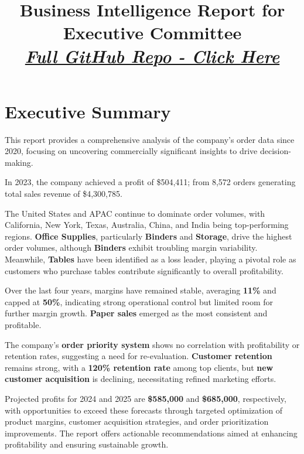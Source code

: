 \documentclass[12pt,a4paper]{article}
\title{Business Intelligence Report for Executive Committee\\
\large \textit{\href{https://github.com/JSammut29/ST2187_coursework_2024-25}{Full GitHub Repo - Click Here}}}
\begin{document}
\maketitle
\clearpage

\null
\clearpage

\thispagestyle{empty}

\section*{Executive Summary}  %

This report provides a comprehensive analysis of the company’s order data since 2020, focusing on uncovering commercially significant insights to drive decision-making. 

In 2023, the company achieved a profit of \$504,411; from 8,572 orders generating total sales revenue of \$4,300,785.

The United States and APAC continue to dominate order volumes, with California, New York, Texas, Australia, China, and India being top-performing regions. \textbf{Office Supplies}, particularly \textbf{Binders} and \textbf{Storage}, drive the highest order volumes, although \textbf{Binders} exhibit troubling margin variability. Meanwhile, \textbf{Tables} have been identified as a loss leader, playing a pivotal role as customers who purchase tables contribute significantly to overall profitability.

Over the last four years, margins have remained stable, averaging \textbf{11\%} and capped at \textbf{50\%}, indicating strong operational control but limited room for further margin growth. \textbf{Paper sales} emerged as the most consistent and profitable.

The company's \textbf{order priority system} shows no correlation with profitability or retention rates, suggesting a need for re-evaluation. \textbf{Customer retention} remains strong, with a \textbf{120\% retention rate} among top clients, but \textbf{new customer acquisition} is declining, necessitating refined marketing efforts.

Projected profits for 2024 and 2025 are \textbf{\$585,000} and \textbf{\$685,000}, respectively, with opportunities to exceed these forecasts through targeted optimization of product margins, customer acquisition strategies, and order prioritization improvements. The report offers actionable recommendations aimed at enhancing profitability and ensuring sustainable growth.
\end{document}
